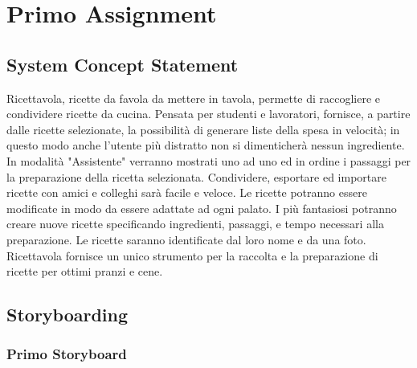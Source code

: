 

\section{Primo Assignment}



\subsection{System Concept Statement}

Ricettavola, ricette da favola da mettere in tavola, permette di raccogliere e condividere ricette da cucina.
Pensata per studenti e lavoratori, fornisce, a partire dalle ricette selezionate, la possibilità di generare liste della spesa in velocità;
in questo modo anche l'utente più distratto non si dimenticherà nessun ingrediente.
In modalità "Assistente" verranno mostrati uno ad uno ed in ordine i passaggi per la preparazione della ricetta selezionata.
Condividere, esportare ed importare ricette con amici e colleghi sarà facile e veloce.
Le ricette potranno essere modificate in modo da essere adattate ad ogni palato.
I più fantasiosi potranno creare nuove ricette specificando ingredienti, passaggi, e tempo necessari alla preparazione.
Le ricette saranno identificate dal loro nome e da una foto.
Ricettavola fornisce un unico strumento per la raccolta e la preparazione di ricette per ottimi pranzi e cene.







\subsection{Storyboarding}
\subsubsection{Primo Storyboard}

